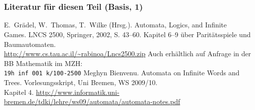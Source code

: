   \section*{}

    \begin{frame}
      \frametitle{Literatur für diesen Teil (Basis, 1)}
      \begin{small}
        \begin{thebibliography}{99}
            E.\ Grädel, W.\ Thomas, T.\ Wilke (Hrsg.).
            \newblock
            Automata, Logics, and Infinite Games.
            \newblock
            LNCS 2500, Springer, 2002, S. 43--60.
            \newblock
            Kapitel 6--9 über Paritätsspiele und Baumautomaten.\\
            \url{http://www.cs.tau.ac.il/~rabinoa/Lncs2500.zip}
            \newblock
            Auch erhältlich auf Anfrage in der BB Mathematik im MZH:\\
            \texttt{19h inf 001 k/100-2500}
            Meghyn Bienvenu.
            \newblock
            Automata on Infinite Words and Trees.
            \newblock
            Vorlesungsskript, Uni Bremen, WS 2009/10.\\
            Kapitel 4.
            \newblock
            \url{http://www.informatik.uni-bremen.de/tdki/lehre/ws09/automata/automata-notes.pdf}
        \end{thebibliography}
        \par
      \end{small}
      \note{~}
    \end{frame}


